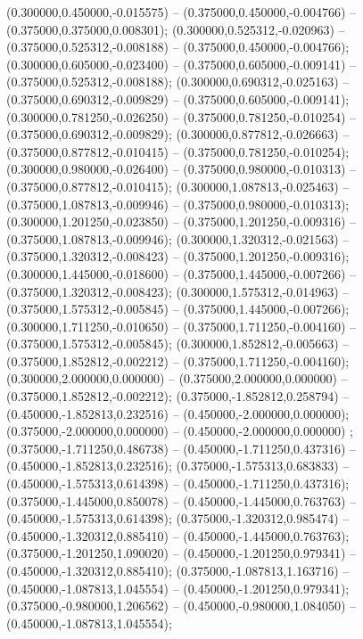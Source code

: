  (0.300000,0.450000,-0.015575) -- (0.375000,0.450000,-0.004766) -- (0.375000,0.375000,0.008301);
 (0.300000,0.525312,-0.020963) -- (0.375000,0.525312,-0.008188) -- (0.375000,0.450000,-0.004766);
 (0.300000,0.605000,-0.023400) -- (0.375000,0.605000,-0.009141) -- (0.375000,0.525312,-0.008188);
 (0.300000,0.690312,-0.025163) -- (0.375000,0.690312,-0.009829) -- (0.375000,0.605000,-0.009141);
 (0.300000,0.781250,-0.026250) -- (0.375000,0.781250,-0.010254) -- (0.375000,0.690312,-0.009829);
 (0.300000,0.877812,-0.026663) -- (0.375000,0.877812,-0.010415) -- (0.375000,0.781250,-0.010254);
 (0.300000,0.980000,-0.026400) -- (0.375000,0.980000,-0.010313) -- (0.375000,0.877812,-0.010415);
 (0.300000,1.087813,-0.025463) -- (0.375000,1.087813,-0.009946) -- (0.375000,0.980000,-0.010313);
 (0.300000,1.201250,-0.023850) -- (0.375000,1.201250,-0.009316) -- (0.375000,1.087813,-0.009946);
 (0.300000,1.320312,-0.021563) -- (0.375000,1.320312,-0.008423) -- (0.375000,1.201250,-0.009316);
 (0.300000,1.445000,-0.018600) -- (0.375000,1.445000,-0.007266) -- (0.375000,1.320312,-0.008423);
 (0.300000,1.575312,-0.014963) -- (0.375000,1.575312,-0.005845) -- (0.375000,1.445000,-0.007266);
 (0.300000,1.711250,-0.010650) -- (0.375000,1.711250,-0.004160) -- (0.375000,1.575312,-0.005845);
 (0.300000,1.852812,-0.005663) -- (0.375000,1.852812,-0.002212) -- (0.375000,1.711250,-0.004160);
 (0.300000,2.000000,0.000000) -- (0.375000,2.000000,0.000000) -- (0.375000,1.852812,-0.002212);
 (0.375000,-1.852812,0.258794) -- (0.450000,-1.852813,0.232516) -- (0.450000,-2.000000,0.000000);
 (0.375000,-2.000000,0.000000) -- (0.450000,-2.000000,0.000000) ;
 (0.375000,-1.711250,0.486738) -- (0.450000,-1.711250,0.437316) -- (0.450000,-1.852813,0.232516);
 (0.375000,-1.575313,0.683833) -- (0.450000,-1.575313,0.614398) -- (0.450000,-1.711250,0.437316);
 (0.375000,-1.445000,0.850078) -- (0.450000,-1.445000,0.763763) -- (0.450000,-1.575313,0.614398);
 (0.375000,-1.320312,0.985474) -- (0.450000,-1.320312,0.885410) -- (0.450000,-1.445000,0.763763);
 (0.375000,-1.201250,1.090020) -- (0.450000,-1.201250,0.979341) -- (0.450000,-1.320312,0.885410);
 (0.375000,-1.087813,1.163716) -- (0.450000,-1.087813,1.045554) -- (0.450000,-1.201250,0.979341);
 (0.375000,-0.980000,1.206562) -- (0.450000,-0.980000,1.084050) -- (0.450000,-1.087813,1.045554);
